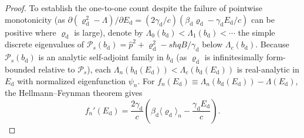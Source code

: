 \documentclass[aps,prd,onecolumn,tightenlines,nofootinbib,notitlepage,11pt,floatfix]{revtex4-2}
\theoremstyle{indentedtheorem}
\begin{document}
\begin{proof}
To establish the one-to-one count despite the failure of pointwise monotonicity (as $\partial(\varrho_\text{d}^2-\Lambda)/\partial E_\text{d}=(2\gamma_\text{d}/c)(\beta_\text{d}\varrho_\text{d}-\gamma_\text{d}E_\text{d}/c)$ can be positive where $\varrho_\text{d}$ is large), denote by $\Lambda_0(b_\text{d})<\Lambda_1(b_\text{d})<\cdots$ the simple discrete eigenvalues of $\mathcal{P}_s(b_\text{d})=\hat{p}^2+\varrho_\text{d}^2-s\hbar qB/\gamma_\text{d}$ below $\Lambda_c(b_\text{d})$. Because $\mathcal{P}_s(b_\text{d})$ is an analytic self-adjoint family in $b_\text{d}$ (as $\varrho_\text{d}$ is infinitesimally form-bounded relative to $\mathcal{P}_s$), each $\Lambda_n(b_\text{d}(E_\text{d}))<\Lambda_c(b_\text{d}(E_\text{d}))$ is real-analytic in $E_\text{d}$ with normalized eigenfunction $\psi_n$. For $f_n(E_\text{d})\equiv\Lambda_n(b_\text{d}(E_\text{d}))-\Lambda(E_\text{d})$, the Hellmann--Feynman theorem gives
\begin{equation*}
    f_n'(E_\text{d}) = \frac{2\gamma_\text{d}}{c}\left(\beta_\text{d}\langle\varrho_\text{d}\rangle_n - \frac{\gamma_\text{d}E_\text{d}}{c}\right) .
\end{equation*}

\end{proof}
\end{document}
